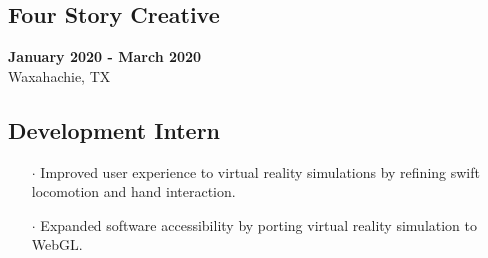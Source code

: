 \documentclass[10pt]{article}
\begin{document}
\begin{paracol}{2}
    \begin{leftcolumn} \vspace{-.36cm}
        \sloppy
        \subsection*{Four Story Creative}
        \textbf{January 2020 -  March 2020} \\ 
        Waxahachie, TX
    \end{leftcolumn}

    \begin{rightcolumn} \vspace{-.36cm}
        \subsection*{Development Intern}
        \begin{itemize}[leftmargin=.28cm, itemsep=1pt]
            \item[$\cdot$] Improved user experience to virtual reality simulations by refining swift locomotion and hand interaction.
            \item[$\cdot$] Expanded software accessibility by porting virtual reality simulation to WebGL.
        \end{itemize}
    \end{rightcolumn}
\end{paracol}


\vspace{-.6cm}
\end{document}
